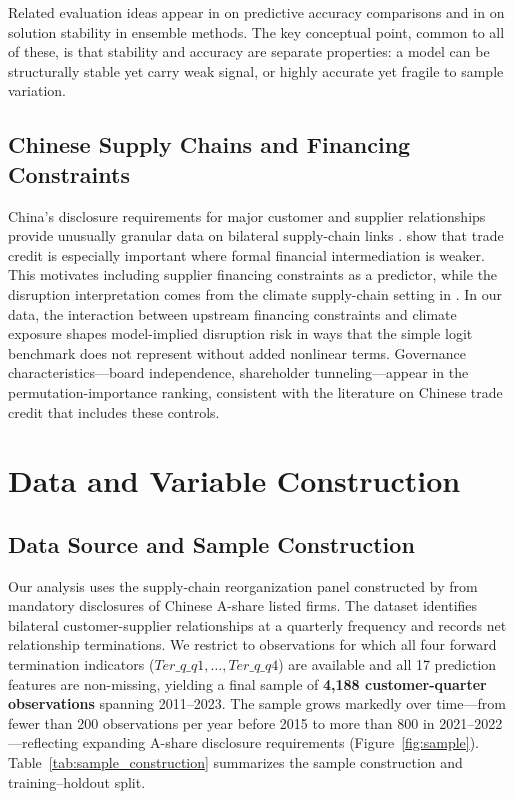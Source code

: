 \documentclass[12pt]{article}
\begin{document}
Related evaluation ideas appear in \citet{diebold1995comparing} on
predictive accuracy comparisons and in \citet{breiman2001random} on
solution stability in ensemble methods.  The key conceptual point, common to
all of these, is that stability and accuracy are separate properties: a model
can be structurally stable yet carry weak signal, or highly accurate yet
fragile to sample variation.

\subsection{Chinese Supply Chains and Financing Constraints}

China's disclosure requirements for major customer and supplier
relationships provide unusually granular data on bilateral supply-chain
links \citep{original2024climate}.  \citet{love2003financial} show that
trade credit is especially important where formal financial intermediation
is weaker.  This motivates including supplier financing constraints as a
predictor, while the disruption interpretation comes from the climate
supply-chain setting in \citet{original2024climate}.  In our data, the
interaction between upstream financing constraints and climate exposure
shapes model-implied disruption risk in ways that the simple logit
benchmark does not represent without added nonlinear terms.  Governance
characteristics---board independence, shareholder tunneling---appear in the
permutation-importance ranking, consistent with the literature on Chinese
trade credit that includes these controls.

\section{Data and Variable Construction}\label{sec:data}

\subsection{Data Source and Sample Construction}

Our analysis uses the supply-chain reorganization panel constructed by
\citet{original2024climate} from mandatory disclosures of Chinese A-share
listed firms.  The dataset identifies bilateral customer-supplier
relationships at a quarterly frequency and records net relationship
terminations.  We restrict to observations for which all four forward
termination indicators ($\textit{Ter\_q\_q1}, \ldots, \textit{Ter\_q\_q4}$)
are available and all 17 prediction features are non-missing, yielding a
final sample of \textbf{4,188 customer-quarter observations} spanning
2011--2023.  The sample grows markedly over time---from fewer than 200
observations per year before 2015 to more than 800 in 2021--2022---reflecting
expanding A-share disclosure requirements (Figure~\ref{fig:sample}).
Table~\ref{tab:sample_construction} summarizes the sample construction
and training--holdout split.
\end{document}
